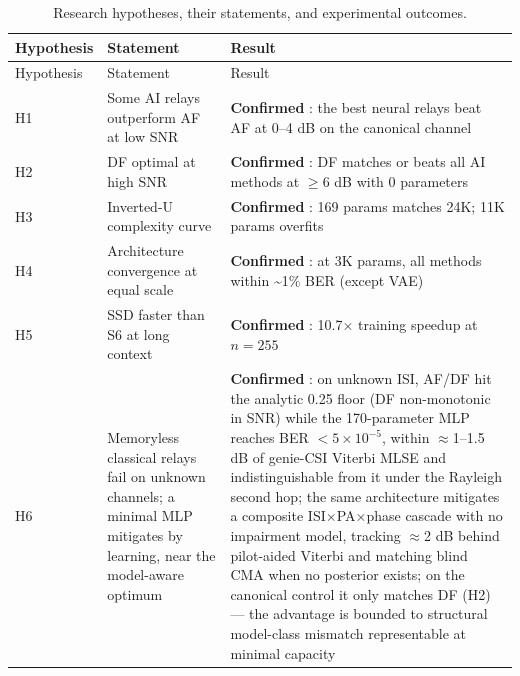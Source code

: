 \begin{longtable}[]{@{}
  >{\raggedright\arraybackslash}p{}
  >{\raggedright\arraybackslash}p{}
  >{\raggedright\arraybackslash}p{}@{}}
\caption{Research hypotheses, their statements, and experimental outcomes.}\label{tbl:table33}\tabularnewline
\toprule\noalign{}
\begin{minipage}[b]{\linewidth}\raggedright
Hypothesis
\end{minipage} & \begin{minipage}[b]{\linewidth}\raggedright
Statement
\end{minipage} & \begin{minipage}[b]{\linewidth}\raggedright
Result
\end{minipage} \\
\midrule\noalign{}
\endfirsthead
\toprule\noalign{}
\begin{minipage}[b]{\linewidth}\raggedright
Hypothesis
\end{minipage} & \begin{minipage}[b]{\linewidth}\raggedright
Statement
\end{minipage} & \begin{minipage}[b]{\linewidth}\raggedright
Result
\end{minipage} \\
\midrule\noalign{}
\endhead
\bottomrule\noalign{}
\endlastfoot
H1 & Some AI relays outperform AF at low SNR & \textbf{Confirmed} : the best neural relays beat AF at 0--4 dB on the canonical channel \\
H2 & DF optimal at high SNR & \textbf{Confirmed} : DF matches or beats all AI methods at \(\geq 6\) dB with 0 parameters \\
H3 & Inverted-U complexity curve & \textbf{Confirmed} : 169 params matches 24K; 11K params overfits \\
H4 & Architecture convergence at equal scale & \textbf{Confirmed} : at 3K params, all methods within \textasciitilde1\% BER (except VAE) \\
H5 & SSD faster than S6 at long context & \textbf{Confirmed} : 10.7× training speedup at \(n = 255\) \\
H6 & Memoryless classical relays fail on unknown channels; a minimal MLP mitigates by learning, near the model-aware optimum & \textbf{Confirmed} : on unknown ISI, AF/DF hit the analytic 0.25 floor (DF non-monotonic in SNR) while the 170-parameter MLP reaches BER $<5\times10^{-5}$, within $\approx$1--1.5 dB of genie-CSI Viterbi MLSE and indistinguishable from it under the Rayleigh second hop; the same architecture mitigates a composite ISI$\times$PA$\times$phase cascade with no impairment model, tracking $\approx$2 dB behind pilot-aided Viterbi and matching blind CMA when no posterior exists; on the canonical control it only matches DF (H2) --- the advantage is bounded to structural model-class mismatch representable at minimal capacity \\
\end{longtable}

